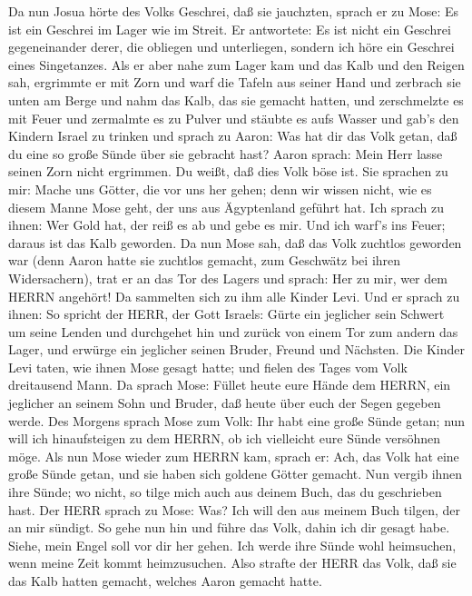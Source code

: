  Da nun Josua hörte des Volks Geschrei, daß sie jauchzten,
sprach er zu Mose: Es ist ein Geschrei im Lager wie im Streit.
 Er antwortete: Es ist nicht ein Geschrei gegeneinander
derer, die obliegen und unterliegen, sondern ich höre ein Geschrei eines
Singetanzes.  Als er aber nahe zum Lager kam und das Kalb
und den Reigen sah, ergrimmte er mit Zorn und warf die Tafeln aus seiner
Hand und zerbrach sie unten am Berge  und nahm das Kalb,
das sie gemacht hatten, und zerschmelzte es mit Feuer und zermalmte es
zu Pulver und stäubte es aufs Wasser und gab's den Kindern Israel zu
trinken  und sprach zu Aaron: Was hat dir das Volk getan,
daß du eine so große Sünde über sie gebracht hast?  Aaron
sprach: Mein Herr lasse seinen Zorn nicht ergrimmen. Du weißt, daß dies
Volk böse ist.  Sie sprachen zu mir: Mache uns Götter, die
vor uns her gehen; denn wir wissen nicht, wie es diesem Manne Mose geht,
der uns aus Ägyptenland geführt hat.  Ich sprach zu ihnen:
Wer Gold hat, der reiß es ab und gebe es mir. Und ich warf's ins Feuer;
daraus ist das Kalb geworden.  Da nun Mose sah, daß das
Volk zuchtlos geworden war (denn Aaron hatte sie zuchtlos gemacht, zum
Geschwätz bei ihren Widersachern),  trat er an das Tor des
Lagers und sprach: Her zu mir, wer dem HERRN angehört! Da sammelten sich
zu ihm alle Kinder Levi.  Und er sprach zu ihnen: So
spricht der HERR, der Gott Israels: Gürte ein jeglicher sein Schwert um
seine Lenden und durchgehet hin und zurück von einem Tor zum andern das
Lager, und erwürge ein jeglicher seinen Bruder, Freund und Nächsten.
 Die Kinder Levi taten, wie ihnen Mose gesagt hatte; und
fielen des Tages vom Volk dreitausend Mann.  Da sprach
Mose: Füllet heute eure Hände dem HERRN, ein jeglicher an seinem Sohn
und Bruder, daß heute über euch der Segen gegeben werde. 
Des Morgens sprach Mose zum Volk: Ihr habt eine große Sünde getan; nun
will ich hinaufsteigen zu dem HERRN, ob ich vielleicht eure Sünde
versöhnen möge.  Als nun Mose wieder zum HERRN kam, sprach
er: Ach, das Volk hat eine große Sünde getan, und sie haben sich goldene
Götter gemacht.  Nun vergib ihnen ihre Sünde; wo nicht, so
tilge mich auch aus deinem Buch, das du geschrieben hast. 
Der HERR sprach zu Mose: Was? Ich will den aus meinem Buch tilgen, der
an mir sündigt.  So gehe nun hin und führe das Volk, dahin
ich dir gesagt habe. Siehe, mein Engel soll vor dir her gehen. Ich werde
ihre Sünde wohl heimsuchen, wenn meine Zeit kommt heimzusuchen.
 Also strafte der HERR das Volk, daß sie das Kalb hatten
gemacht, welches Aaron gemacht hatte.

